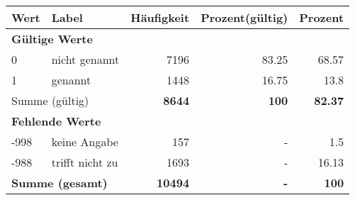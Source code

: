      \begin{longtable}{lXrrr}
     \toprule
     \textbf{Wert} & \textbf{Label} & \textbf{Häufigkeit} & \textbf{Prozent(gültig)} & \textbf{Prozent} \\
     \endhead
     \midrule
     \multicolumn{5}{l}{\textbf{Gültige Werte}}\\

     0 &
     \multicolumn{1}{X}{ nicht genannt   } &


       \num{7196} &
       \num[round-mode=places,round-precision=2]{83.25} &
         \num[round-mode=places,round-precision=2]{68.57} \\

     1 &
     \multicolumn{1}{X}{ genannt   } &


       \num{1448} &
       \num[round-mode=places,round-precision=2]{16.75} &
         \num[round-mode=places,round-precision=2]{13.8} \\
     \midrule
     \multicolumn{2}{l}{Summe (gültig)} &
       \textbf{\num{8644}} &
     \textbf{\num{100}} &
       \textbf{\num[round-mode=places,round-precision=2]{82.37}} \\
     \multicolumn{5}{l}{\textbf{Fehlende Werte}}\\
       -998 &
       keine Angabe &
         \num{157} &
        - &
         \num[round-mode=places,round-precision=2]{1.5} \\
       -988 &
       trifft nicht zu &
         \num{1693} &
        - &
         \num[round-mode=places,round-precision=2]{16.13} \\
     \midrule
     \multicolumn{2}{l}{\textbf{Summe (gesamt)}} &
          \textbf{\num{10494}} &
        \textbf{-} &
        \textbf{\num{100}} \\
     \bottomrule
     \end{longtable}
     

